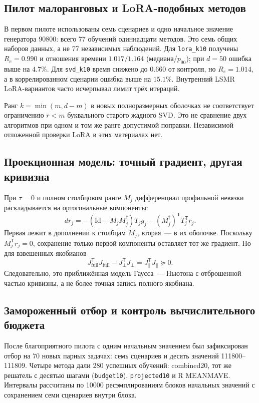 \documentclass[11pt,a4paper]{article}
\numberwithin{equation}{section}
\newcommand{\Id}{\mathrm{Id}}
\newcommand{\T}{^{\mathsf T}}
\newcommand{\file}[1]{\nolinkurl{#1}}
\begin{document}
\subsection{Пилот малоранговых и LoRA-подобных методов}

В первом пилоте использованы семь сценариев и одно начальное значение
генератора 90800: всего 77 обучений одиннадцати методов.
Это семь общих наборов данных, а не 77 независимых наблюдений.
Для \file{lora_k10} получены $R_e=0.990$ и отношения времени
$1.017/1.164$ (медиана/$p_{90}$); при $d=50$ ошибка выше на $4.7\%$.
Для \file{svd_k10} время снижено до $0.660$ от контроля,
но $R_e=1.014$, а в коррелированном сценарии ошибка выше на $15.1\%$.
Внутренний LSMR LoRA-вариантов часто исчерпывал лимит трёх итераций.

Ранг $k=\min(m,d-m)$ в новых полноразмерных оболочках
не соответствует ограничению $r<m$ буквального старого жадного SVD.
Это не сравнение двух алгоритмов при одном и том же ранге допустимой
поправки. Независимой отложенной проверки LoRA в этих материалах нет.
\cite{lowrank}

\subsection{Проекционная модель: точный градиент, другая кривизна}

При $\tau=0$ и полном столбцовом ранге $M_j$ дифференциал
профильной невязки раскладывается на ортогональные компоненты:
\begin{equation}\label{eq:projected}
 dr_j=-(\Id-M_jM_j^\dagger)T_jg_j
      -(M_j^\dagger)\T T_j\T r_j.
\end{equation}
Первая лежит в дополнении к столбцам $M_j$, вторая~--- в их оболочке.
Поскольку $M_j\T r_j=0$, сохранение только первой компоненты
оставляет тот же градиент. Но для взвешенных якобианов
\[
 J_{\mathrm{full}}\T J_{\mathrm{full}}
 -J_\perp\T J_\perp=J_\parallel\T J_\parallel\succeq0.
\]
Следовательно, это приближённая модель Гаусса~--- Ньютона
с отброшенной частью кривизны, а не более точная запись полного якобиана.
\cite{lowrankmath}

\subsection{Замороженный отбор и контроль вычислительного бюджета}

После благоприятного пилота с одним начальным значением был зафиксирован отбор
на 70 новых парных задачах: семь сценариев и десять значений
111800--111809. Четыре метода дали 280 успешных обучений:
combined20, тот же решатель с десятью шагами (\file{budget10}),
\file{projected10} и R MEANMAVE. Интервалы рассчитаны по 10000
ресэмплированиям блоков начальных значений с сохранением семи сценариев
внутри блока.
\end{document}
